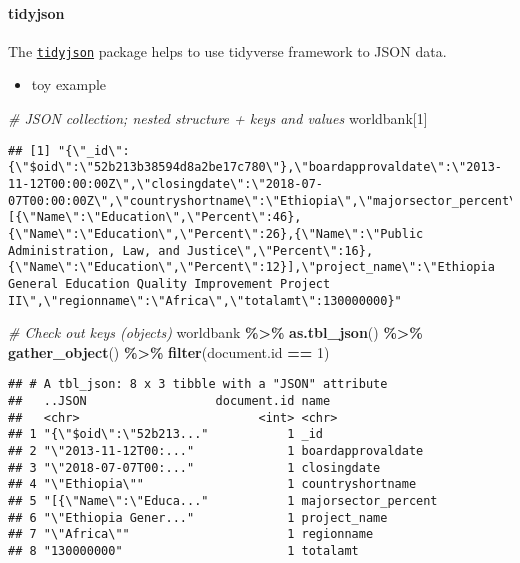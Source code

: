 \documentclass[
]{book}
\newenvironment{Shaded}{\begin{snugshade}}{\end{snugshade}}
\newcommand{\CommentTok}[1]{\textcolor[rgb]{0.56,0.35,0.01}{\textit{#1}}}
\newcommand{\DecValTok}[1]{\textcolor[rgb]{0.00,0.00,0.81}{#1}}
\newcommand{\KeywordTok}[1]{\textcolor[rgb]{0.13,0.29,0.53}{\textbf{#1}}}
\newcommand{\NormalTok}[1]{#1}
\newcommand{\OperatorTok}[1]{\textcolor[rgb]{0.81,0.36,0.00}{\textbf{#1}}}
\newcommand{\StringTok}[1]{\textcolor[rgb]{0.31,0.60,0.02}{#1}}
\providecommand{\tightlist}{%
  \setlength{\itemsep}{0pt}\setlength{\parskip}{0pt}}
\begin{document}
\hypertarget{tidyjson}{%
\paragraph{tidyjson}\label{tidyjson}}

The \href{https://cran.r-project.org/web/packages/tidyjson/vignettes/introduction-to-tidyjson.html}{\texttt{tidyjson}} package helps to use tidyverse framework to JSON data.

\begin{itemize}
\tightlist
\item
  toy example
\end{itemize}

\begin{Shaded}
\begin{Highlighting}[]
\CommentTok{\# JSON collection; nested structure + keys and values }
\NormalTok{worldbank[}\DecValTok{1}\NormalTok{]}
\end{Highlighting}
\end{Shaded}

\begin{verbatim}
## [1] "{\"_id\":{\"$oid\":\"52b213b38594d8a2be17c780\"},\"boardapprovaldate\":\"2013-11-12T00:00:00Z\",\"closingdate\":\"2018-07-07T00:00:00Z\",\"countryshortname\":\"Ethiopia\",\"majorsector_percent\":[{\"Name\":\"Education\",\"Percent\":46},{\"Name\":\"Education\",\"Percent\":26},{\"Name\":\"Public Administration, Law, and Justice\",\"Percent\":16},{\"Name\":\"Education\",\"Percent\":12}],\"project_name\":\"Ethiopia General Education Quality Improvement Project II\",\"regionname\":\"Africa\",\"totalamt\":130000000}"
\end{verbatim}

\begin{Shaded}
\begin{Highlighting}[]
\CommentTok{\# Check out keys (objects)}
\NormalTok{worldbank }\OperatorTok{\%\textgreater{}\%}\StringTok{ }
\StringTok{  }\KeywordTok{as.tbl\_json}\NormalTok{() }\OperatorTok{\%\textgreater{}\%}
\StringTok{  }\KeywordTok{gather\_object}\NormalTok{() }\OperatorTok{\%\textgreater{}\%}
\StringTok{  }\KeywordTok{filter}\NormalTok{(document.id }\OperatorTok{==}\StringTok{ }\DecValTok{1}\NormalTok{)}
\end{Highlighting}
\end{Shaded}

\begin{verbatim}
## # A tbl_json: 8 x 3 tibble with a "JSON" attribute
##   ..JSON                  document.id name               
##   <chr>                         <int> <chr>              
## 1 "{\"$oid\":\"52b213..."           1 _id                
## 2 "\"2013-11-12T00:..."             1 boardapprovaldate  
## 3 "\"2018-07-07T00:..."             1 closingdate        
## 4 "\"Ethiopia\""                    1 countryshortname   
## 5 "[{\"Name\":\"Educa..."           1 majorsector_percent
## 6 "\"Ethiopia Gener..."             1 project_name       
## 7 "\"Africa\""                      1 regionname         
## 8 "130000000"                       1 totalamt
\end{verbatim}
\end{document}
